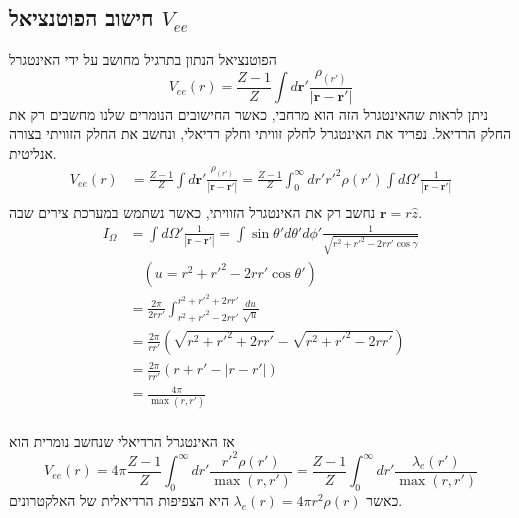 \subsection{חישוב הפוטנציאל $V_{ee}$}
הפוטנציאל הנתון בתרגיל מחושב על ידי האינטגרל
$$
V_{ee}(r) = \frac{Z-1}{Z}\int d\mathbf{r}' \frac{\rho_(r')}{|\mathbf{r} - \mathbf{r}'|} 
$$
ניתן לראות שהאינטגרל הזה הוא מרחבי, כאשר החישובים הנומרים שלנו מחשבים רק את החלק הרדיאל. 
נפריד את האינטגרל לחלק זוויתי וחלק רדיאלי, ונחשב את החלק הזוויתי בצורה אנליטית.
\begin{align*}
    V_{ee}(r) 
    &= \frac{Z-1}{Z}\int d\mathbf{r}' \frac{\rho_(r')}{|\mathbf{r} - \mathbf{r}'|} 
    = \frac{Z-1}{Z}\int_0^\infty dr' r'^2 \rho(r') \int d\Omega' \frac{1}{|\mathbf{r} - \mathbf{r}'|} \\
\end{align*}
נחשב רק את האינטגרל הזוויתי, כאשר נשתמש במערכת צירים שבה $\mathbf{r} = r \hat{z}$.
\begin{align*}
    I_\Omega 
    &= \int d\Omega' \frac{1}{|\mathbf{r} - \mathbf{r}'|} 
    = \int \sin\theta' d\theta' d\phi' \frac{1}{\sqrt{r^2 + r'^2 - 2 r r' \cos\gamma}} \\
    &\quad\left( u = r^2 + r'^2 - 2rr'\cos\theta' \right) \\
    &= \frac{2\pi}{2 r r'} \int_{r^2 + r'^2 -2r r'}^{r^2 + r'^2 +2r r'} \frac{du}{\sqrt{u}} \\
    &= \frac{2\pi}{r r'} \left( \sqrt{r^2 + r'^2 + 2 r r'} - \sqrt{r^2 + r'^2 - 2 r r'} \right) \\
    &= \frac{2\pi}{r r'} \left( r + r' - |r - r'| \right) \\
    &= \frac{4\pi}{\max(r,r')} \\
\end{align*}

אז האינטגרל הרדיאלי שנחשב נומרית הוא
$$
V_{ee}(r)
= 4\pi\frac{Z-1}{Z}\int_0^\infty dr' \frac{r'^2 \rho(r')}{\max(r,r')}
= \frac{Z-1}{Z}\int_0^\infty dr' \frac{\lambda_e(r')}{\max(r,r')}
$$
כאשר $\lambda_e(r) = 4\pi r^2\rho(r)$ היא הצפיפות הרדיאלית של האלקטרונים.